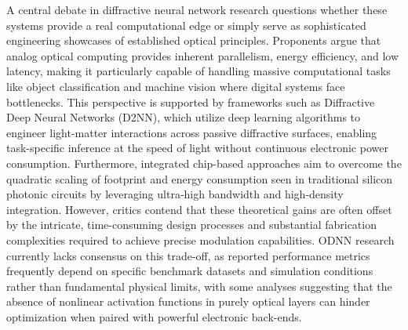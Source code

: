 A central debate in diffractive neural network research questions whether these systems provide a real computational edge or simply serve as sophisticated engineering showcases of established optical principles. Proponents argue that analog optical computing provides inherent parallelism, energy efficiency, and low latency, making it particularly capable of handling massive computational tasks like object classification and machine vision where digital systems face bottlenecks. This perspective is supported by frameworks such as Diffractive Deep Neural Networks (D2NN), which utilize deep learning algorithms to engineer light-matter interactions across passive diffractive surfaces, enabling task-specific inference at the speed of light without continuous electronic power consumption. \citep{doi_10_1021_acsphotonics_4c01284_s001_10346917} Furthermore, integrated chip-based approaches aim to overcome the quadratic scaling of footprint and energy consumption seen in traditional silicon photonic circuits by leveraging ultra-high bandwidth and high-density integration. However, critics contend that these theoretical gains are often offset by the intricate, time-consuming design processes and substantial fabrication complexities required to achieve precise modulation capabilities. ODNN research currently lacks consensus on this trade-off, as reported performance metrics frequently depend on specific benchmark datasets and simulation conditions rather than fundamental physical limits, with some analyses suggesting that the absence of nonlinear activation functions in purely optical layers can hinder optimization when paired with powerful electronic back-ends. \citep{doi_10_3390_nano14221812_4d7d91b1} \citep{doi_10_1515_nanoph_2022_0358_04e3cc8d} \citep{doi_10_1038_s41467_022_28702_0_1b79b43c} \citep{doi_10_1109_jstqe_2019_2921376_c2bef7d6}

